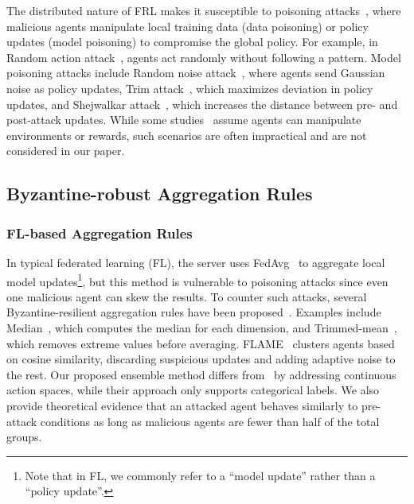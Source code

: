 The distributed nature of FRL makes it susceptible to poisoning attacks~\cite{fang2020local,shejwalkar2021manipulating,fan2021fault,zhang2024poisoning,yin2024poisoning}, where malicious agents manipulate local training data (data poisoning) or policy updates (model poisoning) to compromise the global policy. For example, in Random action attack~\cite{fan2021fault}, agents act randomly without following a pattern. Model poisoning attacks include Random noise attack~\cite{fan2021fault}, where agents send Gaussian noise as policy updates, Trim attack~\cite{fang2020local}, which maximizes deviation in policy updates, and Shejwalkar attack~\cite{shejwalkar2021manipulating}, which increases the distance between pre- and post-attack updates. While some studies~\cite{ma2023local,zhang2020adaptive} assume agents can manipulate environments or rewards, such scenarios are often impractical and are not considered in our paper.



\subsection{Byzantine-robust Aggregation Rules}

\subsubsection{FL-based Aggregation Rules}



In typical federated learning (FL), the server uses FedAvg~\cite{mcmahan2017communication} to aggregate local model updates\footnote{Note that in FL, we commonly refer to a ``model update'' rather than a ``policy update''.}, but this method is vulnerable to poisoning attacks since even one malicious agent can skew the results. To counter such attacks, several Byzantine-resilient aggregation rules have been proposed~\cite{yin2018byzantine,nguyen2022flame,ChenPOMACS17,Blanchard17,cao2020fltrust,xie2019zeno,rajput2019detox,mozaffari2023every,pan2020justinian,zhang2022fldetector,cao2021provably,rieger2022deepsight,fang2024byzantine,fang2022aflguard,fang2025FoundationFL,yueqifedredefense}. 
%
Examples include Median~\cite{yin2018byzantine}, which computes the median for each dimension, and Trimmed-mean~\cite{yin2018byzantine}, which removes extreme values before averaging. FLAME~\cite{nguyen2022flame} clusters agents based on cosine similarity, discarding suspicious updates and adding adaptive noise to the rest.
%
Our proposed ensemble method differs from~\cite{cao2021provably} by addressing continuous action spaces, while their approach only supports categorical labels. We also provide theoretical evidence that an attacked agent behaves similarly to pre-attack conditions as long as malicious agents are fewer than half of the total groups.




